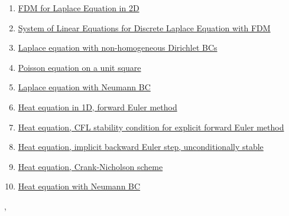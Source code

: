 \documentclass[11pt]{article}
\renewcommand{\today}{\shortmonthname[\the\month] \the \day,  \the\year}
\begin{document}
\begin{multicols}{2}
	\begin{enumerate}
		\item \href{https://mp.weixin.qq.com/s/GYxDOVdBZ-yz0AldbRzKfw}{FDM for Laplace Equation in 2D}	%
		\item \href{https://mp.weixin.qq.com/s/3dHQIBRT1jz5puezMADdUw}{System of Linear Equations for Discrete Laplace Equation with FDM}	%
		\item \href{https://mp.weixin.qq.com/s/CmM-GYuzoWVd5rCHPgEC7A}{Laplace equation with non-homogeneous Dirichlet BCs}	%
		\item \href{https://mp.weixin.qq.com/s/n3VHX-ZthlABzNen_NnAfQ}{Poisson equation on a unit square}	%
		\item \href{https://mp.weixin.qq.com/s/8DiZQA7OD156V2Q4qxdVag}{Laplace equation with Neumann BC}	%
		\item \href{https://mp.weixin.qq.com/s/JoE1-6NE2cNPj0MJFWq5GQ}{Heat equation in 1D, forward Euler method}	%
		\item \href{https://mp.weixin.qq.com/s/ef-e0SnuAB4cjJ_lJC84QA}{Heat equation, CFL stability condition for explicit forward Euler method}	%
		\item \href{https://mp.weixin.qq.com/s/k_O9jjISbrII1ur7B9lYoQ}{Heat equation, implicit backward Euler step, unconditionally stable}	%
		\item \href{https://mp.weixin.qq.com/s/r9P8c6EtdQxUzLoaOeO1xA}{Heat equation, Crank-Nicholson scheme}	%
		\item \href{https://mp.weixin.qq.com/s/8HBzNrEH18BdJ-dgltxWtA}{Heat equation with Neumann BC}	%
	\end{enumerate}
\end{multicols}


%
\begin{flushright}
	\tiny \today 
\end{flushright}
\end{document}
